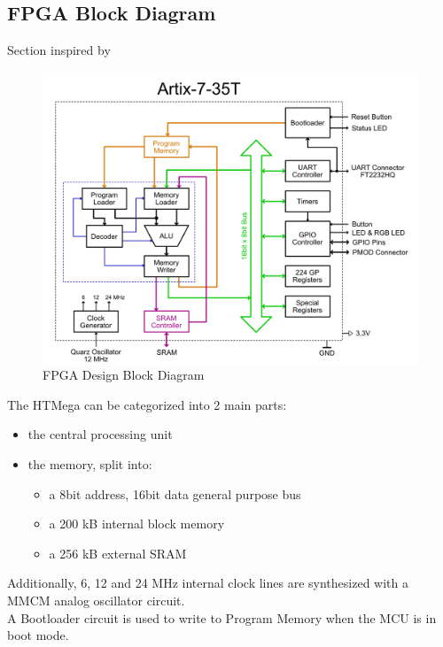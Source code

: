 \subsection{FPGA Block Diagram}
\begin{footnotesize}Section inspired by \cite{atmega328p-cpu-core} \end{footnotesize}

\begin{figure}[h]
    \begin{center}
        \includegraphics[scale=0.32]{assets/HTMega Blockdesign.png}
    \end{center}
    \caption{FPGA Design Block Diagram}
\end{figure}

The HTMega can be categorized into 2 main parts: 
\begin{itemize}
    \item the central processing unit
    \item the memory, split into: 
    \begin{itemize}
        \item a 8bit address, 16bit data general purpose bus 
        \item a 200 kB internal block memory
        \item a 256 kB external SRAM 
    \end{itemize}
\end{itemize}
Additionally, 6, 12 and 24 MHz internal clock lines are synthesized with a\\ MMCM analog oscillator circuit.\\
A Bootloader circuit is used to write to Program Memory when the MCU is in boot mode.
\newpage

